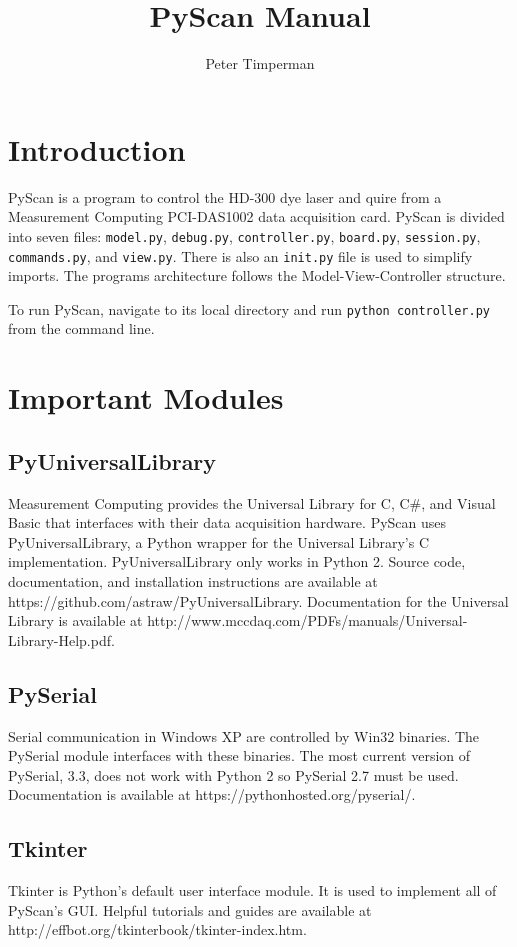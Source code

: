 \documentclass[11pt]{article}
\begin{document}
\author{Peter Timperman}
\title{PyScan Manual}
\maketitle
\section{Introduction}
    PyScan is a program to control the HD-300 dye laser and quire from a Measurement Computing PCI-DAS1002 data acquisition card. 
    PyScan is divided into seven files: \texttt{model.py}, \texttt{debug.py}, \texttt{controller.py}, \texttt{board.py}, \texttt{session.py}, \texttt{commands.py}, and \texttt{view.py}. There is also an \texttt{\textunderscore\textunderscore init.py\textunderscore\textunderscore} file is used to simplify imports. The programs architecture follows the Model-View-Controller structure. 
    
    To run PyScan, navigate to its local directory and run \texttt{python controller.py} from the command line.
    
\section{Important Modules}
\subsection{PyUniversalLibrary}
Measurement Computing provides the Universal Library for  C, C#, and Visual Basic that interfaces with their data acquisition hardware. PyScan uses PyUniversalLibrary, a Python wrapper for the Universal Library's C implementation. PyUniversalLibrary only works in Python 2. Source code, documentation, and installation instructions are available at https://github.com/astraw/PyUniversalLibrary. Documentation for the Universal Library is available at http://www.mccdaq.com/PDFs/manuals/Universal-Library-Help.pdf. \subsection{PySerial}
Serial communication in Windows XP are controlled by Win32 binaries. The PySerial module interfaces with these binaries. The most current version of PySerial, 3.3, does not work with Python 2 so PySerial 2.7 must be used. 
\\ Documentation is available at https://pythonhosted.org/pyserial/.
\subsection{Tkinter}
Tkinter is Python's default user interface module. It is used to implement all of PyScan's GUI. Helpful tutorials and guides are available at http://effbot.org/tkinterbook/tkinter-index.htm.  
\end{document}
